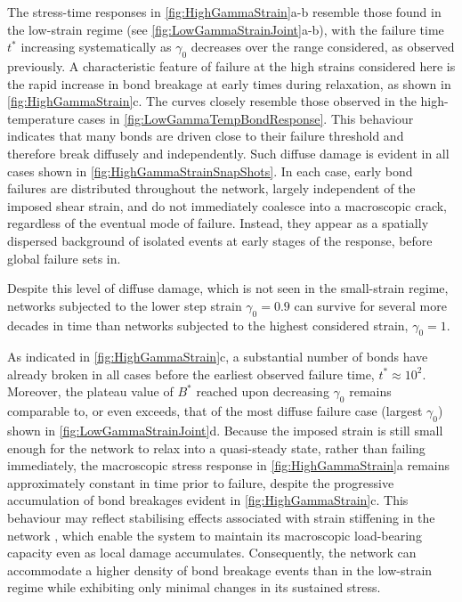 \documentclass[asymmetricmargins]{library/duthesis}%
\begin{document}
The stress-time responses in \cref{fig:HighGammaStrain}a-b resemble those found in the low-strain regime (see \cref{fig:LowGammaStrainJoint}a-b), with the failure time $t^*$ increasing systematically as $\gamma_0$ decreases over the range considered, as observed previously. A characteristic feature of failure at the high strains considered here is the rapid increase in bond breakage at early times during relaxation, as shown in \cref{fig:HighGammaStrain}c. The curves closely resemble those observed in the high-temperature cases in \cref{fig:LowGammaTempBondResponse}. This behaviour indicates that many bonds are driven close to their failure threshold and therefore break diffusely and independently. Such diffuse damage is evident in all cases shown in \cref{fig:HighGammaStrainSnapShots}. In each case, early bond failures are distributed throughout the network, largely independent of the imposed shear strain, and do not immediately coalesce into a macroscopic crack, regardless of the eventual mode of failure. Instead, they appear as a spatially dispersed background of isolated events at early stages of the response, before global failure sets in.

Despite this level of diffuse damage, which is not seen in the small-strain regime, networks subjected to the lower step strain $\gamma_0=0.9$ can survive for several more decades in time than networks subjected to the highest considered strain, $\gamma_0=1$.

As indicated in \cref{fig:HighGammaStrain}c, a substantial number of bonds have already broken in all cases before the earliest observed failure time, $t^*\approx10^{2}$. Moreover, the plateau value of $B^*$ reached upon decreasing $\gamma_0$ remains comparable to, or even exceeds, that of the most diffuse failure case (largest $\gamma_0$) shown in \cref{fig:LowGammaStrainJoint}d. Because the imposed strain is still small enough for the network to relax into a quasi-steady state, rather than failing immediately, the macroscopic stress response in \cref{fig:HighGammaStrain}a remains approximately constant in time prior to failure, despite the progressive accumulation of bond breakages evident in \cref{fig:HighGammaStrain}c. This behaviour may reflect stabilising effects associated with strain stiffening in the network \cite{sharma_strain-controlled_2016}, which enable the system to maintain its macroscopic load-bearing capacity even as local damage accumulates. Consequently, the network can accommodate a higher density of bond breakage events than in the low-strain regime while exhibiting only minimal changes in its sustained stress.
\end{document}
